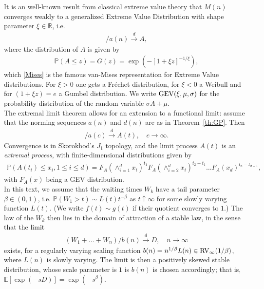 \documentclass[12pt]{article}
\newcommand{\PP}{\mathbb{P}}
\newcommand{\E}{\mathbb{E}}
\newcommand{\1}{\mathbf 1}
\begin{document}
It is an well-known result from classical extreme value theory that $M(n)$ converges weakly to a generalized Extreme Value Distribution with shape parameter $\xi \in \mathbb R$, i.e.
\begin{align}
[M(n) - d(n)] / a(n) \stackrel{d}{\to} A,
\end{align}
where the distribution of $A$ is given by
\begin{align}
\PP(A \le z) = G(z) = \exp\left(-[1+\xi z]^{-1/\xi}\right), \label{Mises}
\end{align}
which \eqref{Mises} is the famous van-Mises representation for Extreme Value distributions. For $\xi>0$ one gets a Fréchet distribution, for $\xi<0$ a Weibull and for $(1+\xi z)=e$ a Gumbel distribution. We write ${\rm GEV}(\xi, \mu, \sigma)$ for the probability 
distribution of the random variable $\sigma A + \mu$. \\
The extremal limit theorem allows for an extension to a functional
limit: assume that the norming sequences $a(n)$ and $d(n)$ are as 
in Theorem~\ref{th:GP}. Then 
\begin{align*}
[M(\lfloor ct \rfloor) - d(c)] / a(c) \stackrel{d}{\to} A(t),
\quad c \to \infty.
\end{align*}
Convergence is in Skorokhod's $J_1$ topology, and the limit
process $A(t)$ is an \emph{extremal process}, with
finite-dimensional distributions given by
\begin{align*}
\PP(A(t_i)\leq x_i,1\leq i \leq d) 
= F_A(\wedge_{i=1}^d x_i)^{t_1} 
F_A(\wedge_{i=2}^d x_i)^{t_2-t_1}
\ldots F_A(x_d)^{t_d-t_{d-1}},
\end{align*}
with $F_A(x)$ being a GEV distribution. \\
In this text, we assume that the waiting times $W_k$ have a tail
parameter $\beta \in (0,1)$, i.e. 
$\PP(W_1 > t) \sim L(t) t^{-\beta}$ as $t \uparrow \infty$ for some slowly varying function $L(t)$.  
(We write $f(t) \sim g(t)$ if their quotient converges to $1$.)
The law of the $W_k$ then lies in the 
domain of attraction of a stable law, in the sense that the limit
\begin{align}\label{eq:sclt}
(W_1 + \ldots + W_n)/b(n) \overset{d}{\longrightarrow} D, 
\quad n \to \infty
\end{align}
exists, for a regularly varying scaling function 
$b(n) = n^{1/\beta} L(n) \in {\rm RV}_\infty(1/\beta)$, 
where $L(n)$ is slowly varying. 
The limit is then a positively skewed stable distribution, 
whose scale parameter is $1$ is $b(n)$ is chosen accordingly; 
that is, 
$\E[\exp(-sD)] = \exp(-s^\beta)$.
\end{document}
